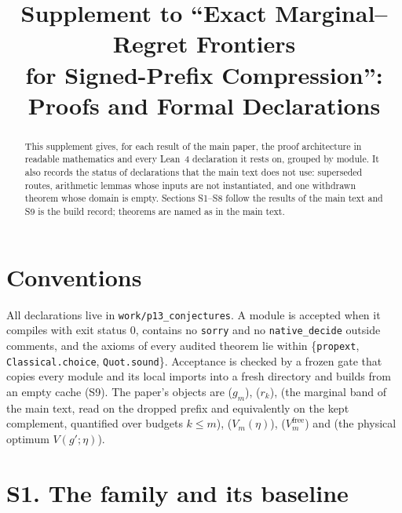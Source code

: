 



\title{Supplement to ``Exact Marginal--Regret Frontiers\\for Signed-Prefix Compression'':\\
Proofs and Formal Declarations}

\author{
}

\maketitle

\begin{abstract}
This supplement gives, for each result of the main paper, the proof architecture in
readable mathematics and every Lean~4 declaration it rests on, grouped by module. It also
records the status of declarations that the main text does not use: superseded routes,
arithmetic lemmas whose inputs are not instantiated, and one withdrawn theorem whose domain
is empty. Sections S1--S8 follow the results of the main text and S9 is the build record;
theorems are named as in the main text.
\end{abstract}

\section*{Conventions}

All declarations live in \texttt{work/p13\_conjectures}. A module is accepted when it
compiles with exit status $0$, contains no \texttt{sorry} and no \texttt{native\_decide}
outside comments, and the axioms of every audited theorem lie within
\{\texttt{propext}, \texttt{Classical.choice}, \texttt{Quot.sound}\}. Acceptance is checked by
a frozen gate that copies every module and its local imports into a fresh directory and
builds from an empty cache (S9). The paper's objects are  ($g_{m}$),
 ($r_{k}$),  (the marginal band of the main text, read on
the dropped prefix and equivalently on the kept complement, quantified over budgets
$k\le m$),  ($V_{m}(\eta)$), 
($V^{\mathrm{free}}_{m}$) and  (the physical optimum $V(g';\eta)$).

\section{S1. The family and its baseline}

